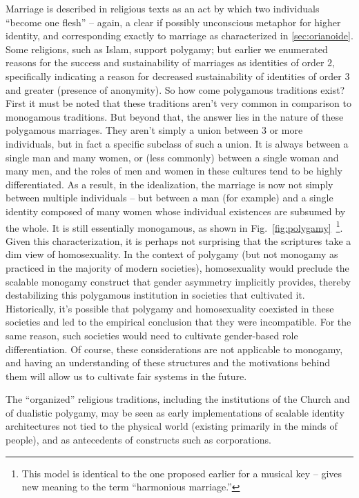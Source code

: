 \documentclass[pra,twocolumn,groupedaddress,10pt]{revtex4}
\theoremstyle{definition}
\begin{document}
Marriage is described in religious texts as an act by which two individuals ``become one flesh''\cite{torahmarriage}\cite{biblemarriage} -- again, a clear if possibly unconscious metaphor for higher identity, and corresponding exactly to marriage as characterized in \autoref{sec:orianoide}. Some religions, such as Islam\cite{quranmarriage}, support polygamy; but earlier we enumerated reasons for the success and sustainability of marriages as identities of order $2$, specifically indicating a reason for decreased sustainability of identities of order $3$ and greater (presence of anonymity). So how come polygamous traditions exist? First it must be noted that these traditions aren't very common in comparison to monogamous traditions. But beyond that, the answer lies in the nature of these polygamous marriages. They aren't simply a union between $3$ or more individuals, but in fact a specific subclass of such a union. It is always between a single man and many women, or (less commonly) between a single woman and many men, and the roles of men and women in these cultures tend to be highly differentiated. As a result, in the idealization, the marriage is now not simply between multiple individuals -- but between a man (for example) and a single identity composed of many women whose individual existences are subsumed by the whole. It is still essentially monogamous, as shown in Fig.~\ref{fig:polygamy}~\footnote{This model is identical to the one proposed earlier for a musical key -- gives new meaning to the term ``harmonious marriage.''}. Given this characterization, it is perhaps not surprising that the scriptures take a dim view of homosexuality. In the context of polygamy (but not monogamy as practiced in the majority of modern societies), homosexuality would preclude the scalable monogamy construct that gender asymmetry implicitly provides, thereby destabilizing this polygamous institution in societies that cultivated it. Historically, it's possible that polygamy and homosexuality coexisted in these societies and led to the empirical conclusion that they were incompatible. For the same reason, such societies would need to cultivate gender-based role differentiation. Of course, these considerations are not applicable to monogamy, and having an understanding of these structures and the motivations behind them will allow us to cultivate fair systems in the future.

The ``organized'' religious traditions, including the institutions of the Church and of dualistic polygamy, may be seen as early implementations of scalable identity architectures not tied to the physical world (existing primarily in the minds of people), and as antecedents of constructs such as corporations.
\end{document}
